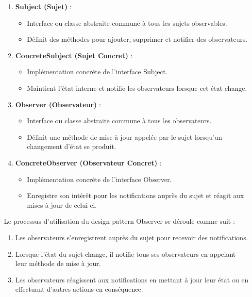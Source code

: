 \begin{enumerate}[leftmargin=*,labelsep=3mm]
    \item \textbf{Subject (Sujet)} :
    \begin{itemize}
        \item Interface ou classe abstraite commune à tous les sujets observables.
        \item Définit des méthodes pour ajouter, supprimer et notifier des observateurs.
    \end{itemize}
    
    \item \textbf{ConcreteSubject (Sujet Concret)} :
    \begin{itemize}
        \item Implémentation concrète de l'interface Subject.
        \item Maintient l'état interne et notifie les observateurs lorsque cet état change.
    \end{itemize}
    
    \item \textbf{Observer (Observateur)} :
    \begin{itemize}
        \item Interface ou classe abstraite commune à tous les observateurs.
        \item Définit une méthode de mise à jour appelée par le sujet lorsqu'un changement d'état se produit.
    \end{itemize}
    
    \item \textbf{ConcreteObserver (Observateur Concret)} :
    \begin{itemize}
        \item Implémentation concrète de l'interface Observer.
        \item Enregistre son intérêt pour les notifications auprès du sujet et réagit aux mises à jour de celui-ci.
    \end{itemize}
\end{enumerate}

Le processus d'utilisation du design pattern Observer se déroule comme suit :

\begin{enumerate}[leftmargin=*,labelsep=3mm]
    \item Les observateurs s'enregistrent auprès du sujet pour recevoir des notifications.
    \item Lorsque l'état du sujet change, il notifie tous ses observateurs en appelant leur méthode de mise à jour.
    \item Les observateurs réagissent aux notifications en mettant à jour leur état ou en effectuant d'autres actions en conséquence.
\end{enumerate}

